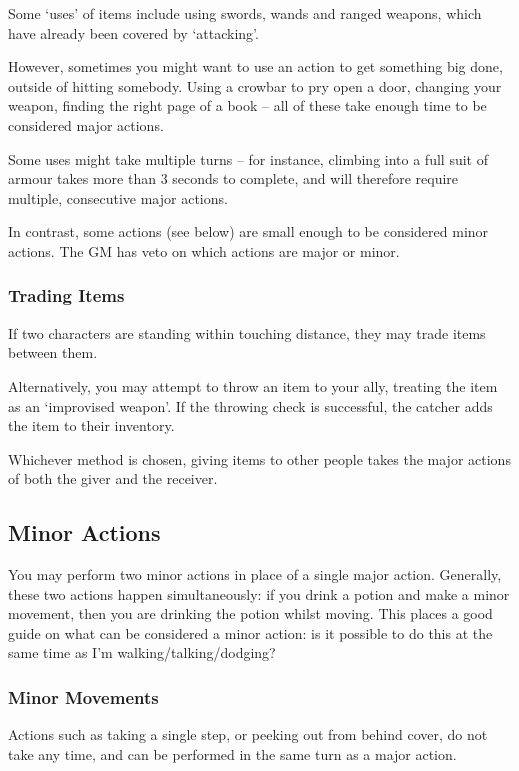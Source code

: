 Some `uses' of items include using swords, wands and ranged weapons, which have already been covered by `attacking'. 

However, sometimes you might want to use an action to get something big done, outside of hitting somebody. Using a crowbar to pry open a door, changing your weapon, finding the right page of a book -- all of these take enough time to be considered major actions. 

Some uses might take multiple turns -- for instance, climbing into a full suit of armour takes more than 3 seconds to complete, and will therefore require multiple, consecutive major actions. 

In contrast, some actions (see below) are small enough to be considered minor actions. The GM has veto on which actions are major or minor. 

\subsubsection{Trading Items}

If two characters are standing within touching distance, they may trade items between them. 

Alternatively, you may attempt to throw an item to your ally, treating the item as an `improvised weapon'. If the throwing check is successful, the catcher adds the item to their inventory. 

Whichever method is chosen, giving items to other people takes the major actions of both the giver and the receiver. 


\subsection{Minor Actions}
You may perform two minor actions in place of a single major action. Generally, these two actions happen simultaneously: if you drink a potion and make a minor movement, then you are drinking the potion whilst moving. This places a good guide on what can be considered a minor action: is it possible to do this at the same time as I'm walking/talking/dodging? 

\subsubsection{Minor Movements}

Actions such as taking a single step, or peeking out from behind cover, do not take any time, and can be performed in the same turn as a major action. 

